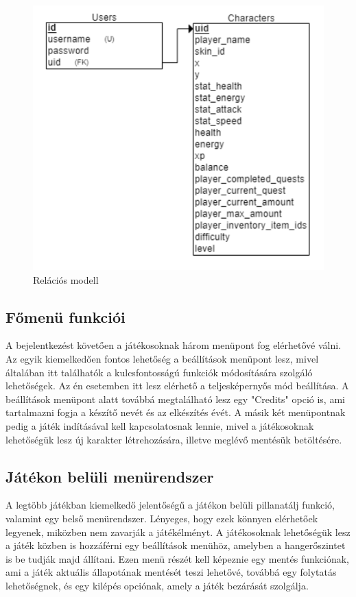 \begin{figure}[H]
    \centering
    \includegraphics[width=10.0truecm]{images/RelationModell.png}
    \caption{Relációs modell}
    \label{fig:Relációs modell}
\end{figure}

\subsection{Főmenü funkciói}

A bejelentkezést követően a játékosoknak három menüpont fog elérhetővé válni. Az egyik kiemelkedően fontos lehetőség a beállítások menüpont lesz, mivel általában itt találhatók a kulcsfontosságú funkciók módosítására szolgáló lehetőségek. Az én esetemben itt lesz elérhető a teljesképernyős mód beállítása. A beállítások menüpont alatt továbbá megtalálható lesz egy "Credits" opció is, ami tartalmazni fogja a készítő nevét és az elkészítés évét. A másik két menüpontnak pedig a játék indításával kell kapcsolatosnak lennie, mivel a játékosoknak lehetőségük lesz új karakter létrehozására, illetve meglévő mentésük betöltésére.


\subsection{Játékon belüli menürendszer}

A legtöbb játékban kiemelkedő jelentőségű a játékon belüli pillanatálj funkció, valamint egy belső menürendszer. Lényeges, hogy ezek könnyen elérhetőek legyenek, miközben nem zavarják a játékélményt. A játékosoknak lehetőségük lesz a játék közben is hozzáférni egy beállítások menühöz, amelyben a hangerőszintet is be tudják majd állítani. Ezen menü részét kell képeznie egy mentés funkciónak, ami a játék aktuális állapotának mentését teszi lehetővé, továbbá egy folytatás lehetőségnek, és egy kilépés opciónak, amely a játék bezárását szolgálja.


